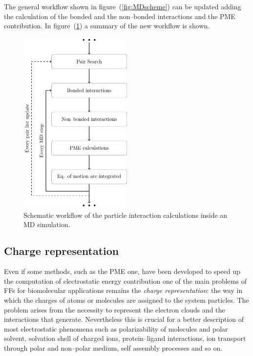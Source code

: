 The general workflow shown in figure~(\ref{fig:MDscheme}) can be updated adding the calculation of the bonded and 
the non--bonded interactions and the \ac{PME} contribution. In figure~(\ref{fig:PPCore}) a summary of the new 
workflow is shown.
\begin{figure}[ht!]
	\center
	\includegraphics[width=0.5\textwidth]{./img/Schemi/PPCores}
	\caption{Schematic workflow of the particle interaction calculations inside an \acs{MD} simulation.}
	\label{fig:PPCore}
\end{figure}

\subsection{Charge representation}
\label{sec:chargeRep}
Even if some methods, such as the \ac{PME} one, have been developed to speed up the computation of electrostatic
energy contribution one of the main problems of \acp{FF} for biomolecular applications remains the \textit{charge
representation}: the way in which the charges of atoms or molecules are assigned to the system particles. The
problem arises from the necessity to represent the electron clouds and the interactions that generate.
Nevertheless this is crucial for a better description of most electrostatic phenomena such as polarizability of
molecules and polar solvent, solvation shell of charged ions, protein--ligand interactions, ion transport through
polar and non--polar medium, self assembly processes and so on.


